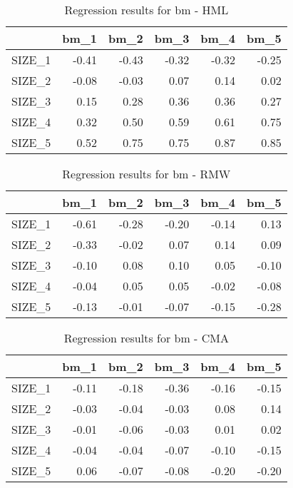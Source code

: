 \begin{table}[ht]
\centering
\caption{Regression results for bm - HML} 
\begin{tabular}{rrrrrr}
  \hline
 & bm\_1 & bm\_2 & bm\_3 & bm\_4 & bm\_5 \\ 
  \hline
SIZE\_1 & -0.41 & -0.43 & -0.32 & -0.32 & -0.25 \\ 
  SIZE\_2 & -0.08 & -0.03 & 0.07 & 0.14 & 0.02 \\ 
  SIZE\_3 & 0.15 & 0.28 & 0.36 & 0.36 & 0.27 \\ 
  SIZE\_4 & 0.32 & 0.50 & 0.59 & 0.61 & 0.75 \\ 
  SIZE\_5 & 0.52 & 0.75 & 0.75 & 0.87 & 0.85 \\ 
   \hline
\end{tabular}
\end{table}


\begin{table}[ht]
\centering
\caption{Regression results for bm - RMW} 
\begin{tabular}{rrrrrr}
  \hline
 & bm\_1 & bm\_2 & bm\_3 & bm\_4 & bm\_5 \\ 
  \hline
SIZE\_1 & -0.61 & -0.28 & -0.20 & -0.14 & 0.13 \\ 
  SIZE\_2 & -0.33 & -0.02 & 0.07 & 0.14 & 0.09 \\ 
  SIZE\_3 & -0.10 & 0.08 & 0.10 & 0.05 & -0.10 \\ 
  SIZE\_4 & -0.04 & 0.05 & 0.05 & -0.02 & -0.08 \\ 
  SIZE\_5 & -0.13 & -0.01 & -0.07 & -0.15 & -0.28 \\ 
   \hline
\end{tabular}
\end{table}


\begin{table}[ht]
\centering
\caption{Regression results for bm - CMA} 
\begin{tabular}{rrrrrr}
  \hline
 & bm\_1 & bm\_2 & bm\_3 & bm\_4 & bm\_5 \\ 
  \hline
SIZE\_1 & -0.11 & -0.18 & -0.36 & -0.16 & -0.15 \\ 
  SIZE\_2 & -0.03 & -0.04 & -0.03 & 0.08 & 0.14 \\ 
  SIZE\_3 & -0.01 & -0.06 & -0.03 & 0.01 & 0.02 \\ 
  SIZE\_4 & -0.04 & -0.04 & -0.07 & -0.10 & -0.15 \\ 
  SIZE\_5 & 0.06 & -0.07 & -0.08 & -0.20 & -0.20 \\ 
   \hline
\end{tabular}
\end{table}


